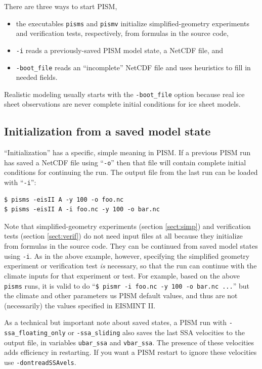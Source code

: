 \documentclass[titlepage,letterpaper,final]{scrartcl}
\begin{document}
There are three ways to start PISM,\begin{itemize}
\item the executables \texttt{pisms} and \texttt{pismv} initialize simplified-geometry experiments and verification tests, respectively, from formulas in the source code,
\item \texttt{-i} reads a previously-saved PISM model state, a NetCDF file, and
\item \texttt{-boot_file} reads an ``incomplete'' NetCDF file and uses heuristics to fill in needed fields.
\end{itemize}
Realistic modeling usually starts with the \texttt{-boot_file} option because real ice sheet observations are never complete initial conditions for ice sheet models.

\subsection{Initialization from a saved model state}  ``Initialization'' has a specific, simple meaning in PISM.  If a previous PISM run has saved a NetCDF file using ``\texttt{-o}'' then that file will contain complete initial conditions for continuing the run.  The output file from the last run can be loaded with ``\texttt{-i}'': 

\begin{verbatim}
$ pisms -eisII A -y 100 -o foo.nc
$ pisms -eisII A -i foo.nc -y 100 -o bar.nc
\end{verbatim}
\smallskip

Note that simplified-geometry experiments (section \ref{sect:simp}) and verification tests (section \ref{sect:verif}) do not need input files at all because they initialize from formulas in the source code.  They can be continued from saved model states using \texttt{-i}.  As in the above example, however, specifying the simplified geometry experiment or verification test \emph{is} necessary, so that the run can continue with the climate inputs for that experiment or test.  For example, based on the above \texttt{pisms} runs, it is valid to do ``\texttt{\$ pismr -i foo.nc -y 100 -o bar.nc ...}'' but the climate and other parameters us PISM default values, and thus are not (necessarily) the values specified in EISMINT II.

As a technical but important note about saved states, a PISM run with \texttt{-ssa_floating_only} or \texttt{-ssa_sliding}
also saves the last SSA velocities to the output file, in variables 
\texttt{ubar_ssa} and \texttt{vbar_ssa}. The presence
of these velocities adds efficiency in restarting.  If you want a PISM restart to
ignore these velocities use \texttt{-dontreadSSAvels}.
\end{document}
